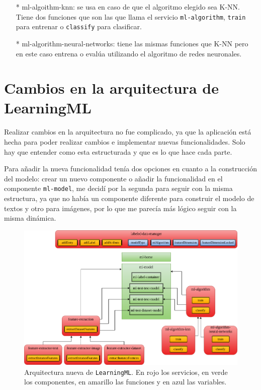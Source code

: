 \documentclass[a4paper, 12pt]{book}
\begin{document}
\begin{itemize}
	\begin{itemize}
		\item[*] ml-algoithm-knn: se usa en caso de que el algoritmo elegido sea K-NN. Tiene dos funciones que son las que llama el servicio \texttt{ml-algorithm}, \texttt{train} para entrenar o \texttt{classify} para clasificar.
		\item[*] ml-algorithm-neural-networks: tiene las mismas funciones que K-NN pero en este caso entrena o evalúa utilizando el algoritmo de redes neuronales.
	\end{itemize}
\end{itemize}

\section{Cambios en la arquitectura de LearningML} 
\label{sec:arquitectura nueva}

Realizar cambios en la arquitectura no fue complicado, ya que la aplicación está hecha para poder realizar cambios e implementar nuevas funcionalidades. Solo hay que entender como esta estructurada y que es lo que hace cada parte.

Para añadir la nueva funcionalidad tenía dos opciones en cuanto a la construcción del modelo: crear un nuevo componente o añadir la funcionalidad en el componente \texttt{ml-model}, me decidí por la segunda para seguir con la misma estructura, ya que no había un componente diferente para construir el modelo de textos y otro para imágenes, por lo que me parecía más lógico seguir con la misma dinámica.

\begin{figure}[b!]
	\centering 
	\includegraphics[width=13cm, keepaspectratio]{img/arquitectura_nueva.png}
	\caption{Arquitectura nueva de \texttt{LearningML}. En rojo los servicios, en verde los componentes, en amarillo las funciones y en azul las variables.} \label{fig:arquitectura_nueva}
\end{figure}
\end{document}
